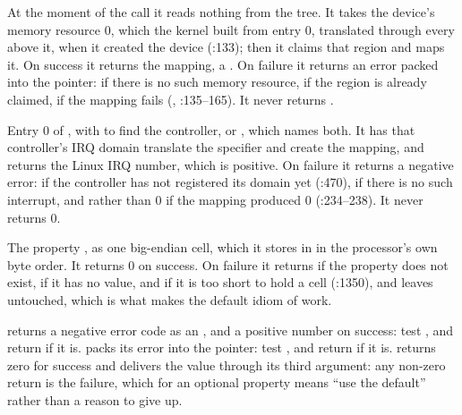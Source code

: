 
 At the moment of the call it reads nothing from the tree. It takes the device's memory
resource 0, which the kernel built from  entry 0, translated through every 
above it, when it created the device (:133); then it claims that region
and maps it. On success it returns the mapping, a . On failure it returns an
error packed into the pointer:  if there is no such memory resource,  if
the region is already claimed,  if the mapping fails
(, :135--165). It never returns .

 Entry 0 of , with  to find the controller, or
, which names both. It has that controller's IRQ domain translate the
specifier and create the mapping, and returns the Linux IRQ number, which is positive. On failure
it returns a negative error:  if the controller has not registered its domain
yet (:470),  if there is no such interrupt, and 
rather than 0 if the mapping produced 0 (:234--238). It never returns
0.

 The property , as one big-endian cell, which it stores in  in the
processor's own byte order. It returns 0 on success. On failure it returns  if the
property does not exist,  if it has no value, and  if it is too
short to hold a cell (:1350), and leaves  untouched, which is what
makes the default idiom of  work.

  returns a negative error code as an , and a positive
number on success: test , and return  if it is.
 packs its error into the pointer: test ,
and return  if it is.  returns zero for success and
delivers the value through its third argument: any non-zero return is the failure, which for an
optional property means ``use the default'' rather than a reason to give up.

